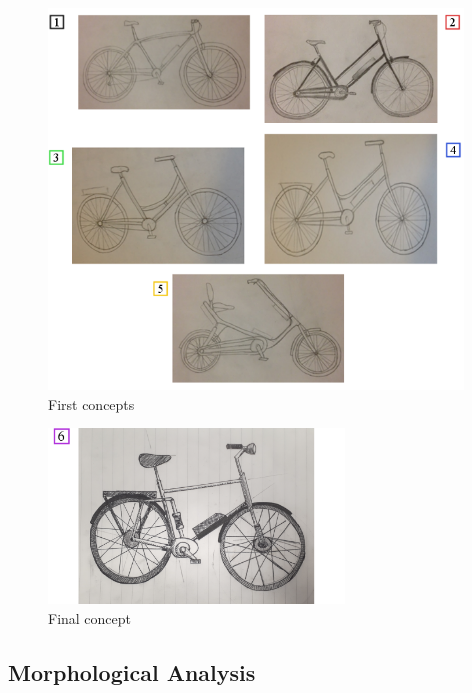 \documentclass[a4paper,11pt]{article}
\begin{document}
\begin{figure}[!ht]
	\centering
	\includegraphics[width=0.98\textwidth]{ske}
	\caption{First concepts}
	\label{fig:sk}
\end{figure}

\begin{figure}[!ht]
	\centering
	\includegraphics[width=0.7\textwidth]{fic}
	\caption{Final concept}
	\label{fig:fs}
\end{figure}

\subsection{Morphological Analysis}
\end{document}
